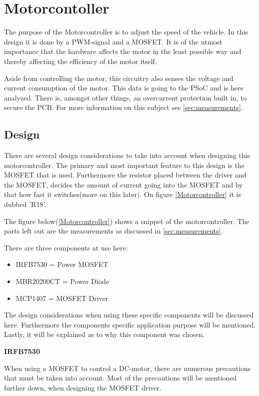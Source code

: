\section{Motorcontoller}
The purpose of the Motorcontroller is to adjust the speed of the vehicle. In this design it is done by a PWM-signal and a MOSFET. It is of the utmost importance that the hardware affects the motor in the least possible way and thereby affecting the efficiency of the motor itself.

Aside from controlling the motor, this circuitry also senses the voltage and current consumption of the motor. This data is going to the PSoC and is here analyzed. There is, amongst other things, an overcurrent protection built in, to secure the PCB. For more information on this subject see \vref{sec:measurements}.

\subsection{Design}
There are several design considerations to take into account when designing this motorcontroller. The primary and most important feature to this design is the MOSFET that is used. Furthermore the resistor placed between the driver and the MOSFET, decides the amount of current going into the MOSFET and by that how fast it switches(more on this later). On figure \vref{Motorcontroller} it is dubbed 'R18'. 

The figure below(\vref{Motorcontroller}) shows a snippet of the motorcontroller. The parts left out are the measurements as discussed in \vref{sec:measurements}.

There are three components at use here:

\begin{itemize}
	\item{IRFB7530 = Power MOSFET}
	\item{MBR20200CT = Power Diode}
	\item{MCP1407 = MOSFET Driver}
\end{itemize}

The design considerations when using these specific components will be discussed here. Furthermore the components specific application purpose will be mentioned. Lastly, it will be explained as to why this component was chosen.  

\textbf{IRFB7530} \cite{IRFB7530}

When using a MOSFET to control a DC-motor, there are numerous precautions that must be taken into account. Most of the precautions will be mentioned further down, when designing the MOSFET driver. 

